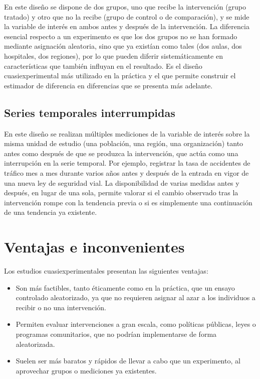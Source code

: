 \documentclass[
  spanish,
  a4paper,
]{scrreport}
\providecommand{\tightlist}{%
  \setlength{\itemsep}{0pt}\setlength{\parskip}{0pt}}
\theoremstyle{definition}
\theoremstyle{definition}
\theoremstyle{remark}
\begin{document}
En este diseño se dispone de dos grupos, uno que recibe la intervención
(grupo tratado) y otro que no la recibe (grupo de control o de
comparación), y se mide la variable de interés en ambos antes y después
de la intervención. La diferencia esencial respecto a un experimento es
que los dos grupos no se han formado mediante asignación aleatoria, sino
que ya existían como tales (dos aulas, dos hospitales, dos regiones),
por lo que pueden diferir sistemáticamente en características que
también influyan en el resultado. Es el diseño cuasiexperimental más
utilizado en la práctica y el que permite construir el estimador de
diferencia en diferencias que se presenta más adelante.

\subsection{Series temporales
interrumpidas}\label{series-temporales-interrumpidas}

En este diseño se realizan múltiples mediciones de la variable de
interés sobre la misma unidad de estudio (una población, una región, una
organización) tanto antes como después de que se produzca la
intervención, que actúa como una interrupción en la serie temporal. Por
ejemplo, registrar la tasa de accidentes de tráfico mes a mes durante
varios años antes y después de la entrada en vigor de una nueva ley de
seguridad vial. La disponibilidad de varias medidas antes y después, en
lugar de una sola, permite valorar si el cambio observado tras la
intervención rompe con la tendencia previa o si es simplemente una
continuación de una tendencia ya existente.

\section{Ventajas e inconvenientes}\label{ventajas-e-inconvenientes-6}

Los estudios cuasiexperimentales presentan las siguientes ventajas:

\begin{itemize}
\tightlist
\item
  Son más factibles, tanto éticamente como en la práctica, que un ensayo
  controlado aleatorizado, ya que no requieren asignar al azar a los
  individuos a recibir o no una intervención.
\item
  Permiten evaluar intervenciones a gran escala, como políticas
  públicas, leyes o programas comunitarios, que no podrían implementarse
  de forma aleatorizada.
\item
  Suelen ser más baratos y rápidos de llevar a cabo que un experimento,
  al aprovechar grupos o mediciones ya existentes.
\end{itemize}
\end{document}
